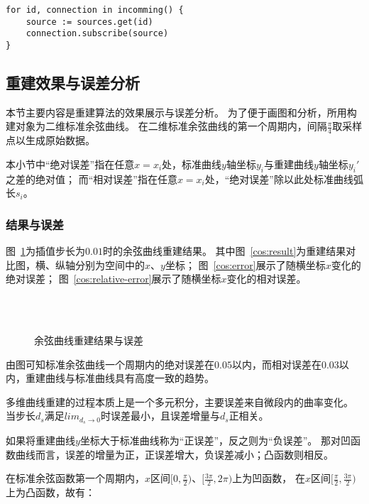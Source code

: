 \begin{lstlisting}[caption={订阅数据源}]
for id, connection in incomming() {
    source := sources.get(id)
    connection.subscribe(source)
}
\end{lstlisting}

\subsection{重建效果与误差分析}
\label{sec:error-analyze}

本节主要内容是重建算法的效果展示与误差分析。
为了便于画图和分析，所用构建对象为二维标准余弦曲线。
在二维标准余弦曲线的第一个周期内，间隔$\frac{\pi}{4}$取采样点以生成原始数据。

本小节中“绝对误差”指在任意$x=x_i$处，标准曲线$y$轴坐标$y_i$与重建曲线$y$轴坐标$y_i'$之差的绝对值；
而“相对误差”指在任意$x=x_i$处，“绝对误差”除以此处标准曲线弧长$s_i$。

\subsubsection{结果与误差}
\FloatBarrier
图~\ref{fig:cos}为插值步长为$0.01$时的余弦曲线重建结果。
其中图~\ref{cos:result}为重建结果对比图，横、纵轴分别为空间中的$x$、$y$坐标；
图~\ref{cos:error}展示了随横坐标$x$变化的绝对误差；
图~\ref{cos:relative-error}展示了随横坐标$x$变化的相对误差。

\begin{figure}
\centering
{}\\
\\
\caption{余弦曲线重建结果与误差}
\label{fig:cos}
\end{figure}

由图可知标准余弦曲线一个周期内的绝对误差在$0.05$以内，而相对误差在$0.03$以内，重建曲线与标准曲线具有高度一致的趋势。

多维曲线重建的过程本质上是一个多元积分，主要误差来自微段内的曲率变化。
当步长$d_s$满足$lim_{d_s\rightarrow 0}$时误差最小，且误差增量与$d_s$正相关。

如果将重建曲线$y$坐标大于标准曲线称为“正误差”，反之则为“负误差”。
那对凹函数曲线而言，误差的增量为正，正误差增大，负误差减小；凸函数则相反。

在标准余弦函数第一个周期内，$x$区间$[0, \frac{\pi}{2})$、$[\frac{3\pi}{2}, 2\pi)$上为凹函数，
在$x$区间$[\frac{\pi}{2}, \frac{3\pi}{2})$上为凸函数，故有：

